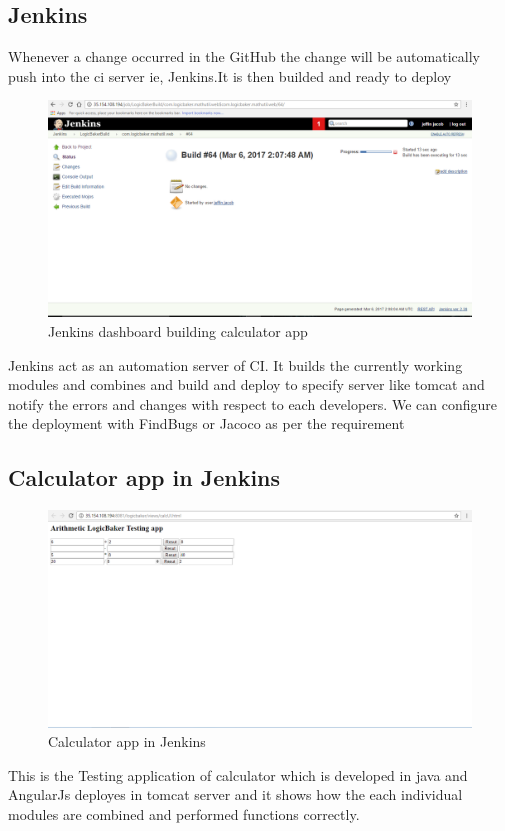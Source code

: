\documentclass[12pt,a4paper,oneside]{report}
\begin{document}
{\subsection{Jenkins}
\par Whenever a change occurred in the GitHub the change will be automatically push into the ci server ie, Jenkins.It is then builded and ready to deploy
\begin{figure}[h]
\begin{center}
\includegraphics[scale=.47]{jnks.png}
\caption{Jenkins dashboard building calculator app}
\label{Jenkins dashboard building calculator app}
\end{center}
\end{figure}
\par Jenkins act as an automation server of CI. It builds the currently working modules and combines and build and deploy to specify server like tomcat and notify the errors and changes with respect to each developers.  We can configure the deployment with FindBugs or Jacoco as per the requirement
\newpage
\subsection{Calculator app in Jenkins}
\begin{figure}[h]
\begin{center}
\includegraphics[scale=.47]{app.png}
\caption{Calculator app in Jenkins}
\label{Calculator app in Jenkins }
\end{center}
\end{figure}
\par This is the Testing application of calculator which is developed in java and AngularJs deployes in tomcat server and it shows how the each individual modules are combined and performed functions correctly. 
\newpage
}
\end{document}
